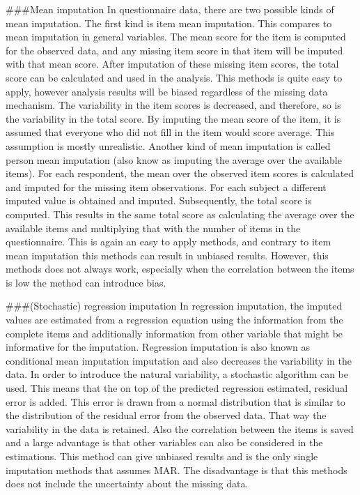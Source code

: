 \documentclass[
]{book}
\begin{document}
\#\#\#Mean imputation
In questionnaire data, there are two possible kinds of mean imputation. The first kind is item mean imputation. This compares to mean imputation in general variables. The mean score for the item is computed for the observed data, and any missing item score in that item will be imputed with that mean score. After imputation of these missing item scores, the total score can be calculated and used in the analysis. This methods is quite easy to apply, however analysis results will be biased regardless of the missing data mechanism. The variability in the item scores is decreased, and therefore, so is the variability in the total score. By imputing the mean score of the item, it is assumed that everyone who did not fill in the item would score average. This assumption is mostly unrealistic.
Another kind of mean imputation is called person mean imputation (also know as imputing the average over the available items). For each respondent, the mean over the observed item scores is calculated and imputed for the missing item observations. For each subject a different imputed value is obtained and imputed. Subsequently, the total score is computed. This results in the same total score as calculating the average over the available items and multiplying that with the number of items in the questionnaire. This is again an easy to apply methods, and contrary to item mean imputation this methods can result in unbiased results. However, this methods does not always work, especially when the correlation between the items is low the method can introduce bias.

\#\#\#(Stochastic) regression imputation
In regression imputation, the imputed values are estimated from a regression equation using the information from the complete items and additionally information from other variable that might be informative for the imputation. Regression imputation is also known as conditional mean imputation imputation and also decreases the variability in the data. In order to introduce the natural variability, a stochastic algorithm can be used. This means that the on top of the predicted regression estimated, residual error is added. This error is drawn from a normal distribution that is similar to the distribution of the residual error from the observed data. That way the variability in the data is retained. Also the correlation between the items is saved and a large advantage is that other variables can also be considered in the estimations. This method can give unbiased results and is the only single imputation methods that assumes MAR. The disadvantage is that this methods does not include the uncertainty about the missing data.
\end{document}
